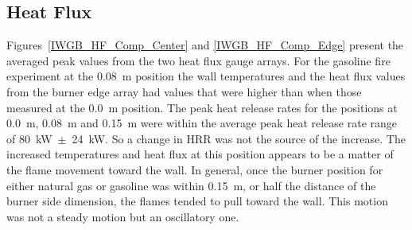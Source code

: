 \documentclass[twoside]{uocthesis}
\begin{document}
\subsection{Heat Flux}

Figures~\ref{IWGB_HF_Comp_Center} and \ref{IWGB_HF_Comp_Edge} present the averaged peak values from the two heat flux gauge arrays.  For the gasoline fire experiment at the 0.08~m position the wall temperatures and the heat flux values from the burner edge array had values that were higher than when those measured at the 0.0~m position. The peak heat release rates for the positions at 0.0~m, 0.08~m and 0.15~m were within the average peak heat release rate range of 80~kW~$\pm$~24~kW.  So a change in HRR was not the source of the increase.  The increased temperatures and heat flux at this position appears to be a matter of the flame movement toward the wall.  In general, once the burner position for either natural gas or gasoline was within 0.15~m, or half the distance of the burner side dimension, the flames tended to pull toward the wall. This motion was not a steady motion but an oscillatory one.      
\end{document}
